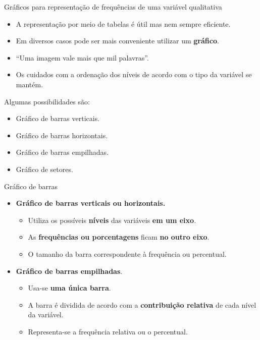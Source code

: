 \documentclass[
  ignorenonframetext,
  serif,
  professionalfont,
  usenames,
  dvipsnames,
  aspectratio = 169]{beamer}
\providecommand{\tightlist}{%
  \setlength{\itemsep}{0pt}\setlength{\parskip}{0pt}}
\renewcommand{\tightlist}{%
  \setlength{\itemsep}{0\baselineskip}
  \setlength{\parskip}{0.25\baselineskip}
}
\def\beginAHalfColumn{\begin{minipage}{0.49\textwidth}}%
\def\endColumns{\end{minipage}}%
\begin{document}
\begin{frame}{Gráficos para representação de frequências de uma variável
qualitativa}
\protect\hypertarget{gruxe1ficos-para-representauxe7uxe3o-de-frequuxeancias-de-uma-variuxe1vel-qualitativa}{}
\beginAHalfColumn

\begin{itemize}
\item
  A representação por meio de tabelas é útil mas nem sempre eficiente.
\item
  Em diversos casos pode ser mais conveniente utilizar um
  \textbf{gráfico}.
\item
  ``Uma imagem vale mais que mil palavras''.
\item
  Os cuidados com a ordenação dos níveis de acordo com o tipo da
  variável se mantém.
\end{itemize}

\endColumns
\beginAHalfColumn

Algumas possibilidades são:

\begin{itemize}
\tightlist
\item
  Gráfico de barras verticais.
\item
  Gráfico de barras horizontais.
\item
  Gráfico de barras empilhadas.
\item
  Gráfico de setores.
\end{itemize}

\endColumns
\end{frame}

\begin{frame}{Gráfico de barras}
\protect\hypertarget{gruxe1fico-de-barras}{}
\begin{itemize}
\tightlist
\item
  \textbf{Gráfico de barras verticais ou horizontais.}

  \begin{itemize}
  \tightlist
  \item
    Utiliza os possíveis \textbf{níveis} das variáveis
    \textbf{em um eixo}.
  \item
    As \textbf{frequências ou porcentagens} ficam
    \textbf{no outro eixo}.
  \item
    O tamanho da barra correspondente à frequência ou percentual.
  \end{itemize}
\item
  \textbf{Gráfico de barras empilhadas}.

  \begin{itemize}
  \tightlist
  \item
    Usa-se \textbf{uma única barra}.
  \item
    A barra é dividida de acordo com a \textbf{contribuição relativa} de
    cada nível da variável.
  \item
    Representa-se a frequência relativa ou o percentual.
  \end{itemize}
\end{itemize}
\end{frame}
\end{document}
